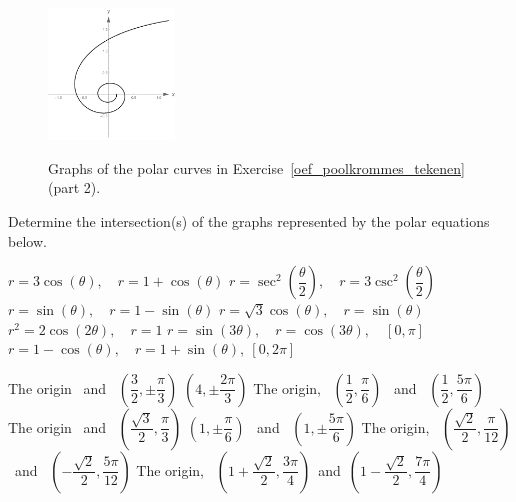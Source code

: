 \begin{Answer}
\begin{figure}[H]
{{		    \includegraphics[width=0.3\textwidth]{fig_parametric_oef_4ob}} 
            }
            \caption{Graphs of the polar curves in Exercise~\ref{oef_poolkrommes_tekenen} (part 2).}
            \label{fig_poolkrommes_deel2}
        \end{figure}
\end{Answer}

\begin{Exercise} Determine the intersection(s) of the graphs represented by the polar equations below.
\begin{multicols}{2}
	\Question[difficulty = 1] $r = 3 \cos (\theta), \quad r = 1 + \cos (\theta)$ 
	\ifanalysis\Question[difficulty = 1]\fi\ifcalculus\Question[difficulty = 2]\fi $r = \sec^2 \left(\dfrac{\theta}{2} \right), \quad r = 3\csc^2 \left(\dfrac{\theta}{2} \right)$ 
	\Question[difficulty = 1] $r=\sin (\theta), \quad r = 1 - \sin (\theta)$ 
	\Question[difficulty = 1] $r= \sqrt{3} \cos (\theta), \quad r = \sin (\theta)$
	\Question[difficulty = 1] $r^2=2 \cos (2\theta), \quad r = 1$
	\Question[difficulty = 1] $r= \sin (3\theta), \quad r = \cos (3\theta), \quad [0, \pi]$
	\Question[difficulty = 1] $r= 1-\cos (\theta), \quad r = 1+\sin (\theta), \  [0, 2\pi]$ 
    \EndCurrentQuestion
\end{multicols}

\end{Exercise}

\begin{Answer}\phantom{}
    
			\Question The origin \, and \, $\left(\dfrac{3}{2}, \pm \dfrac{\pi}{3}\right)$
			\Question $\left(4, \pm \dfrac{2\pi}{3}\right)$
			\Question The origin, \, $\left(\dfrac{1}{2}, \dfrac{\pi}{6}\right)$ \, and \, $\left(\dfrac{1}{2}, \dfrac{5\pi}{6}\right)$
			\Question The origin \, and \, $\left(\dfrac{\sqrt{3}}{2}, \dfrac{\pi}{3}\right)$  
			\Question $\left(1, \pm \dfrac{\pi}{6}\right)$ \, and \, $\left(1, \pm \dfrac{5\pi}{6}\right)$  
            \Question The origin, \, $\left(\dfrac{\sqrt{2}}{2}, \dfrac{\pi}{12}\right)$\, and \, $\left(-\dfrac{\sqrt{2}}{2}, \dfrac{5\pi}{12}\right)$  
            \Question The origin, \, $\left(1+\dfrac{\sqrt{2}}{2}, \dfrac{3\pi}{4}\right)$\, and \,$\left(1-\dfrac{\sqrt{2}}{2}, \dfrac{7\pi}{4}\right)$
		
\end{Answer}

